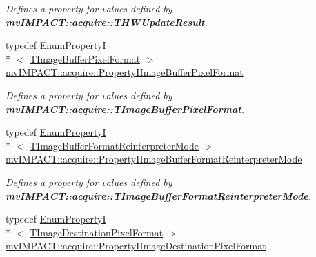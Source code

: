 \begin{DoxyCompactItemize}
\begin{DoxyCompactList}\small\item\em Defines a property for values defined by {\bfseries mv\+I\+M\+P\+A\+C\+T\+::acquire\+::\+T\+H\+W\+Update\+Result}. \end{DoxyCompactList}\item 
\hypertarget{group___common_interface_ga4f53082cdae4edfc1f87e928a0ab4184}{typedef \hyperlink{classmv_i_m_p_a_c_t_1_1acquire_1_1_enum_property_i}{Enum\+Property\+I}\\*
$<$ \hyperlink{group___common_interface_ga456e8aa76e06bb761f27c52141475985}{T\+Image\+Buffer\+Pixel\+Format} $>$ \hyperlink{group___common_interface_ga4f53082cdae4edfc1f87e928a0ab4184}{mv\+I\+M\+P\+A\+C\+T\+::acquire\+::\+Property\+I\+Image\+Buffer\+Pixel\+Format}}\label{group___common_interface_ga4f53082cdae4edfc1f87e928a0ab4184}

\begin{DoxyCompactList}\small\item\em Defines a property for values defined by {\bfseries mv\+I\+M\+P\+A\+C\+T\+::acquire\+::\+T\+Image\+Buffer\+Pixel\+Format}. \end{DoxyCompactList}\item 
\hypertarget{group___common_interface_ga7fd91208d37ae9034d9639d64e0e0e25}{typedef \hyperlink{classmv_i_m_p_a_c_t_1_1acquire_1_1_enum_property_i}{Enum\+Property\+I}\\*
$<$ \hyperlink{group___common_interface_ga077e155accbe145213c1c34895f961f2}{T\+Image\+Buffer\+Format\+Reinterpreter\+Mode} $>$ \hyperlink{group___common_interface_ga7fd91208d37ae9034d9639d64e0e0e25}{mv\+I\+M\+P\+A\+C\+T\+::acquire\+::\+Property\+I\+Image\+Buffer\+Format\+Reinterpreter\+Mode}}\label{group___common_interface_ga7fd91208d37ae9034d9639d64e0e0e25}

\begin{DoxyCompactList}\small\item\em Defines a property for values defined by {\bfseries mv\+I\+M\+P\+A\+C\+T\+::acquire\+::\+T\+Image\+Buffer\+Format\+Reinterpreter\+Mode}. \end{DoxyCompactList}\item 
\hypertarget{group___common_interface_ga4b749ac6f5a0ae8744177180cfa1c955}{typedef \hyperlink{classmv_i_m_p_a_c_t_1_1acquire_1_1_enum_property_i}{Enum\+Property\+I}\\*
$<$ \hyperlink{group___common_interface_ga02e0fc32ff10e0bc0f2e8b9c321d65c9}{T\+Image\+Destination\+Pixel\+Format} $>$ \hyperlink{group___common_interface_ga4b749ac6f5a0ae8744177180cfa1c955}{mv\+I\+M\+P\+A\+C\+T\+::acquire\+::\+Property\+I\+Image\+Destination\+Pixel\+Format}}\label{group___common_interface_ga4b749ac6f5a0ae8744177180cfa1c955}


\end{DoxyCompactItemize}
